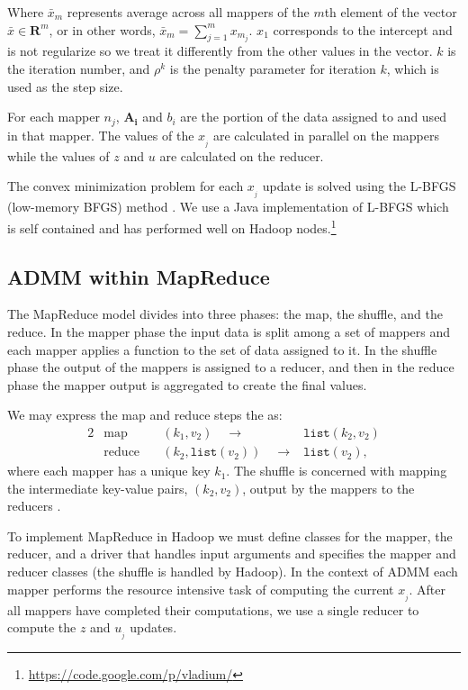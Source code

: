 \documentclass[10pt, conference, compsocconf]{IEEEtran}
\begin{document}
Where $\bar{x}_m$ represents average across all mappers of the $m$th element of the vector $\bar{x}\in\mathbf{R}^m$, or in other words, $\bar{x}_m = \sum_{j=1}^m x_{m_j}$.  $x_1$ corresponds to the intercept and is not regularize so we treat it differently from the other values in the vector.  $k$ is the iteration number, and $\rho^k$ is the penalty parameter for iteration $k$, which is used as the step size.

For each mapper $n_j$, $\mathbf{A_i}$ and $b_i$ are the portion of the data assigned to and used in that mapper.  The values of the $x_{_j}$ are calculated in parallel on the mappers while the values of $z$ and $u$ are calculated on the reducer.

The convex minimization problem for each $x_{_j}$ update is solved using the L-BFGS (low-memory BFGS) method \cite{bonnans2003numerical}.  We use a Java implementation of L-BFGS which is self contained and has performed well on Hadoop nodes.\footnote{\url{https://code.google.com/p/vladium/}}

\subsection{ADMM within MapReduce}
The MapReduce model divides into three phases: the map, the shuffle, and the reduce.  In the mapper phase the input data is split among a set of mappers and each mapper applies a function to the set of data assigned to it.  In the shuffle phase the output of the mappers is assigned to a reducer, and then in the reduce phase the mapper output is aggregated to create the final values.

We may express the map and reduce steps the as:
\begin{alignat*}{2}
&\text{map}\quad &(k_1,v_2)\quad\rightarrow &\texttt{list}(k_2,v_2)\\
&\text{reduce}\quad &(k_2,\texttt{list}(v_2))\quad\rightarrow &\texttt{list}(v_2),
\end{alignat*}
where each mapper has a unique key $k_1$.  The shuffle is concerned with mapping the intermediate key-value pairs, $(k_2,v_2)$, output by the mappers to the reducers \cite{dean2004}.

To implement MapReduce in Hadoop we must define classes for the mapper, the reducer, and a driver that handles input arguments and specifies the mapper and reducer classes (the shuffle is handled by Hadoop).  In the context of ADMM each mapper performs the resource intensive task of computing the current $x_{_j}$.  After all mappers have completed their computations, we use a single reducer to compute the $z$ and $u_{_j}$ updates.
\end{document}
